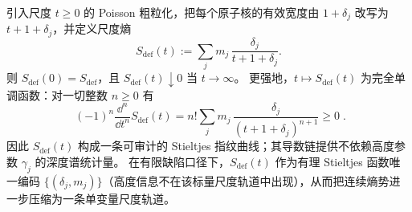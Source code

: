 \begin{proposition}
引入尺度 \(t\ge0\) 的 Poisson 粗粒化，把每个原子核的有效宽度由 \(1+\delta_j\) 改写为 \(t+1+\delta_j\)，并定义尺度熵
\[
S_{\mathrm{def}}(t):=\sum_{j}m_j\,\frac{\delta_j}{t+1+\delta_j}.
\]
则 \(S_{\mathrm{def}}(0)=S_{\mathrm{def}}\)，且 \(S_{\mathrm{def}}(t)\downarrow 0\) 当 \(t\to\infty\)。
更强地，\(t\mapsto S_{\mathrm{def}}(t)\) 为完全单调函数：对一切整数 \(n\ge0\) 有
\[
\boxed{\;
(-1)^n\frac{\dd^n}{\dd t^n}S_{\mathrm{def}}(t)
=n!\sum_{j}m_j\,\frac{\delta_j}{(t+1+\delta_j)^{n+1}}\ge0\; }.
\]
因此 \(S_{\mathrm{def}}(t)\) 构成一条可审计的 Stieltjes 指纹曲线；其导数链提供不依赖高度参数 \(\gamma_j\) 的深度谱统计量。
在有限缺陷口径下，\(S_{\mathrm{def}}(t)\) 作为有理 Stieltjes 函数唯一编码 \(\{(\delta_j,m_j)\}\)（高度信息不在该标量尺度轨道中出现），从而把连续熵势进一步压缩为一条单变量尺度轨道。
\end{proposition}





\endinput

